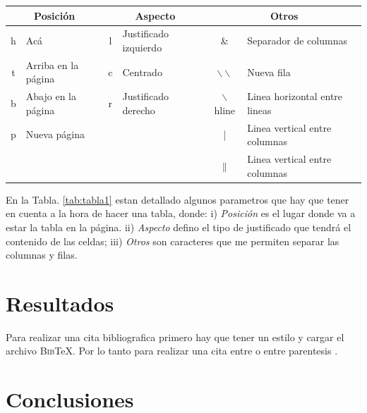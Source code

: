 \documentclass[a4paper,12pt]{article} %
\begin{document}
\begin{table}[h] %
 \centering
 {\scriptsize %
 \begin{tabular}{||c|l|c|l|c|l||} %
  \hline
  \multicolumn{2}{||c|}{Posición} & \multicolumn{2}{c|}{Aspecto} & \multicolumn{2}{c||}{Otros} \\ \hline
  h    & Acá 		                 & l & Justificado izquierdo & $\&$                    & Separador de columnas \\ \hline
  t    & Arriba en la página             & c & Centrado              & $\backslash \backslash$ &  Nueva fila \\ \hline
  b    & Abajo en la página              & r & Justificado derecho   & $\backslash$hline       & Linea horizontal entre lineas \\ \hline
  p    & Nueva página        		 &   &                       & |                       & Linea vertical entre columnas \\ \hline
       &                                 &   &                       & $\|$                    & Linea vertical entre columnas \\ \hline
 \end{tabular}
 }
 \label{tab:tabla2}
\end{table}

En la Tabla. \ref{tab:tabla1} estan detallado algunos parametros que hay que tener en cuenta a la hora de hacer una tabla, donde: i) \textit{Posición} es el lugar donde va a estar la tabla en la página. ii) \textit{Aspecto} defino el tipo de justificado que tendrá el contenido de las celdas; iii) \textit{Otros} son caracteres que me permiten separar las columnas y filas.

\section{Resultados}
Para realizar una cita bibliografica primero hay que tener un estilo y cargar el archivo \textsc{Bib}\TeX{}. Por lo tanto para realizar una cita entre \citet{Blakely1996} o entre parentesis \citep{Blakely1996}.

\section{Conclusiones}


\newpage


\tableofcontents{}


\end{document}
